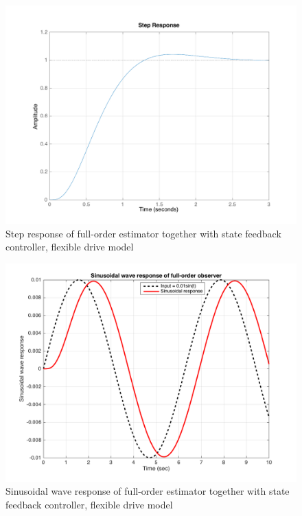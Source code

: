 \documentclass[a4paper, 12pt]{article}
\begin{document}
\begin{figure}[!htbp]
\centering
\includegraphics[scale = 0.3]{FlexibleStepResponseFullOrderEst}
\caption{Step response of full-order estimator together with state feedback controller, flexible drive model}
\label{FlexibleStepResponseFullOrderEst}
\end{figure}

\begin{figure}[!htbp]
\centering
\includegraphics[scale = 0.3]{FlexibleSinusoidalResponseFullOrderEst}
\caption{Sinusoidal wave response of full-order estimator together with state feedback controller, flexible drive model}
\label{FlexibleSinusoidalResponseFullOrderEst}
\end{figure}
\end{document}

